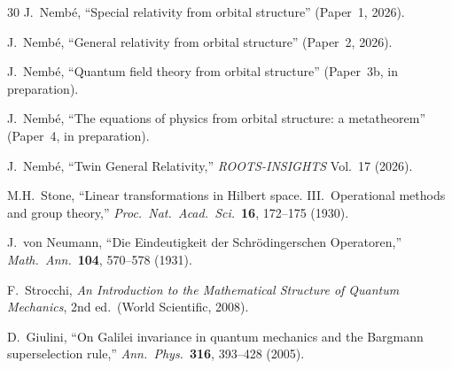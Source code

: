 \documentclass[12pt]{article}
\theoremstyle{plain}
\theoremstyle{definition}
\theoremstyle{remark}
\begin{document}
\begin{thebibliography}{30}
 J.~Nemb\'e, ``Special relativity from orbital structure'' (Paper~1, 2026).

 J.~Nemb\'e, ``General relativity from orbital structure'' (Paper~2, 2026).

 J.~Nemb\'e, ``Quantum field theory from orbital structure'' (Paper~3b, in preparation).

 J.~Nemb\'e, ``The equations of physics from orbital structure: a metatheorem'' (Paper~4, in preparation).

 J.~Nemb\'e, ``Twin General Relativity,'' \emph{ROOTS-INSIGHTS} Vol.~17 (2026).

 M.H.~Stone, ``Linear transformations in Hilbert space. III.\ Operational methods and group theory,'' \emph{Proc.\ Nat.\ Acad.\ Sci.}\ \textbf{16}, 172--175 (1930).

 J.~von Neumann, ``Die Eindeutigkeit der Schr\"odingerschen Operatoren,'' \emph{Math.\ Ann.}\ \textbf{104}, 570--578 (1931).

 F.~Strocchi, \emph{An Introduction to the Mathematical Structure of Quantum Mechanics}, 2nd ed.\ (World Scientific, 2008).

 D.~Giulini, ``On Galilei invariance in quantum mechanics and the Bargmann superselection rule,'' \emph{Ann.\ Phys.}\ \textbf{316}, 393--428 (2005).

\end{thebibliography}
\end{document}
